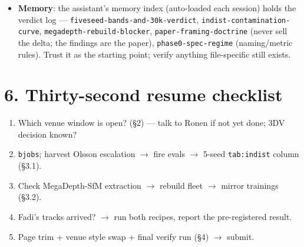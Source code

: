\documentclass[11pt]{article}
\newcommand{\code}[1]{\texttt{\small #1}}
\begin{document}
\begin{itemize}[leftmargin=1.4em,itemsep=2pt]
\code{models\_all} to best+final+reselection winners (\code{prune\_checkpoints\_dryrun.py});
lean eval outputs are default (diagnostics only via \code{eval.save\_eval\_diagnostics = True}
appended as an \code{eval \{\}} block to a generated conf, with a \code{\_diag\_eval} root).
\item \textbf{Memory}: the assistant's memory index (auto-loaded each session) holds the
verdict log — \code{fiveseed-bands-and-30k-verdict}, \code{indist-contamination-curve},
\code{megadepth-rebuild-blocker}, \code{paper-framing-doctrine} (never sell the delta; the
findings are the paper), \code{phase0-spec-regime} (naming/metric rules). Trust it as the
starting point; verify anything file-specific still exists.
\end{itemize}

\section*{6. Thirty-second resume checklist}

\begin{enumerate}[leftmargin=1.6em,itemsep=1pt]
\item Which venue window is open? (\S2) — talk to Ronen if not yet done; 3DV decision known?
\item \code{bjobs}; harvest Olsson escalation $\rightarrow$ fire evals $\rightarrow$ 5-seed
\code{tab:indist} column (\S3.1).
\item Check MegaDepth-SfM extraction $\rightarrow$ rebuild fleet $\rightarrow$ mirror
trainings (\S3.2).
\item Fadi's tracks arrived? $\rightarrow$ run both recipes, report the pre-registered result.
\item Page trim + venue style swap + final verify run (\S4) $\rightarrow$ submit.
\end{enumerate}
\end{document}
